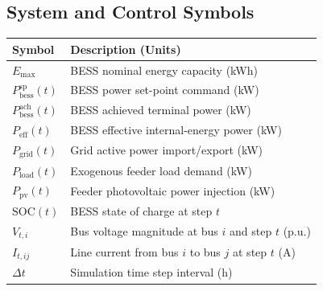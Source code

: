 \subsection*{System and Control Symbols}
\begin{tabular}{@{}>{\raggedright\arraybackslash}p{}@{\hspace{0.5em}}>{\raggedright\arraybackslash}p{}@{}}
\toprule
Symbol & Description (Units) \\
\midrule
$E_{\max}$ & BESS nominal energy capacity (kWh) \\
$P_{\mathrm{bess}}^{\mathrm{sp}}(t)$ & BESS power set-point command (kW) \\
$P_{\mathrm{bess}}^{\mathrm{ach}}(t)$ & BESS achieved terminal power (kW) \\
$P_{\mathrm{eff}}(t)$ & BESS effective internal-energy power (kW) \\
$P_{\mathrm{grid}}(t)$ & Grid active power import/export (kW) \\
$P_{\mathrm{load}}(t)$ & Exogenous feeder load demand (kW) \\
$P_{\mathrm{pv}}(t)$ & Feeder photovoltaic power injection (kW) \\
$\mathrm{SOC}(t)$ & BESS state of charge at step $t$ \\
$V_{t,i}$ & Bus voltage magnitude at bus $i$ and step $t$ (p.u.) \\
$I_{t,ij}$ & Line current from bus $i$ to bus $j$ at step $t$ (A) \\
$\Delta t$ & Simulation time step interval (h) \\
\bottomrule
\end{tabular}

